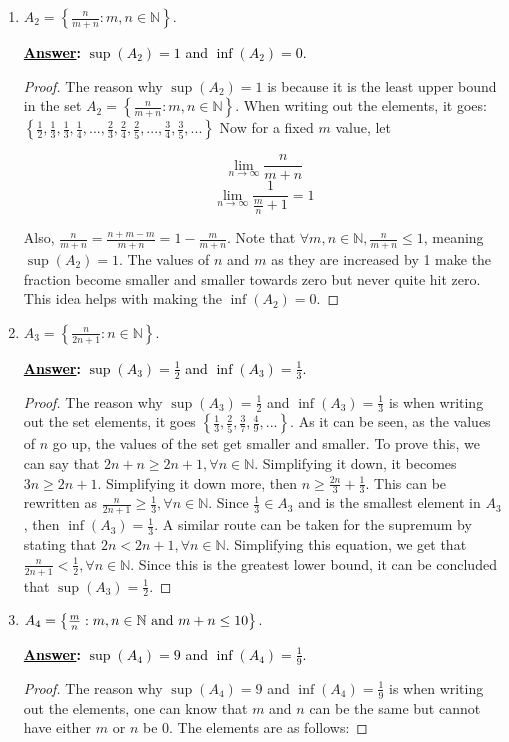 \documentclass[10pt]{article}
\begin{document}
\begin{enumerate}
\begin{enumerate}
	
	\item  $A_2 = \left\{\frac{n}{m+n}: m, n \in \mathbb{N}\right\}$.
	\par \medskip
	\textbf{\textcolor{black}{\underline{Answer}:}}
\textcolor{black}{$\sup{(A_2)}=1$ and $\inf{(A_2)} = 0$.}
\begin{proof}
The reason why $\sup{(A_2)}=1$ is because it is the least upper bound in the set $A_2 = \left\{\frac{n}{m+n}: m, n \in \mathbb{N}\right\}$.  When writing out the elements, it goes:$\left\{\frac{1}{2}, \frac{1}{3}, \frac{1}{3}, \frac{1}{4},...,\frac{2}{3}, \frac{2}{4}, \frac{2}{5},...,\frac{3}{4}, \frac{3}{5}, ...\right\}$ Now for a fixed $m$ value, let 
\begin{center}
\[\lim_{n\to\infty} \frac{n}{m+n}\] 
\[\lim_{n\to\infty} \frac{1}{\frac{m}{n} + 1} = 1\]
\end{center}
Also, $\frac{n}{m+n} = \frac{n+m-m}{m+n}=1-\frac{m}{m+n}$.  Note that $\forall m, n \in \mathbb{N}, \frac{n}{m+n} \leq 1$, meaning $\sup{(A_2)} =1$.
The values of $n$ and $m$ as they are increased by 1 make the fraction become smaller and smaller towards zero but never quite hit zero.  This idea helps with making the $\inf{(A_2)} = 0$.  
\end{proof}
	\item  $A_3 = \left\{\frac{n}{2n+1}: n \in \mathbb{N}\right\}$.
		\par \medskip
	\textbf{\textcolor{black}{\underline{Answer}:}}
\textcolor{black}{$\sup{(A_3)}=\frac{1}{2}$ and $\inf{(A_3)} = \frac{1}{3}$.}
\begin{proof}
The reason why $\sup{(A_3)}=\frac{1}{2}$ and $\inf{(A_3)} = \frac{1}{3}$ is when writing out the set elements, it goes $\left\{\frac{1}{3}, \frac{2}{5}, \frac{3}{7}, \frac{4}{9},...\right\}$.  As it can be seen, as the values of $n$ go up, the values of the set get smaller and smaller.  To prove this, we can say that $2n+n \geq 2n+1, \forall n \in \mathbb{N}$.  Simplifying it down, it becomes $3n \geq 2n+1$.  Simplifying it down more, then $n \geq \frac{2n}{3} + \frac{1}{3}$.  This can be rewritten as $\frac{n}{2n+1} \geq \frac{1}{3}, \forall n \in \mathbb{N}$.  Since $\frac{1}{3} \in A_3$ and is the smallest element in $A_3$, then $\inf{(A_3)} = \frac{1}{3}$.  A similar route can be taken for the supremum by stating that $2n < 2n+1, \forall n \in \mathbb{N}$.  Simplifying this equation, we get that $\frac{n}{2n+1} < \frac{1}{2}, \forall n \in \mathbb{N}$.  Since this is the greatest lower bound, it can be concluded that $\sup{(A_3)} = \frac{1}{2}$.
\end{proof}
	\item  $A_4 = \left\{ \frac{m}{n} : m, n \in \mathbb{N} \textnormal{ and } m+n \leq 10\right\}$.
		\par \medskip
	\textbf{\textcolor{black}{\underline{Answer}:}}
\textcolor{black}{$\sup{(A_4)}=9$ and $\inf{(A_4)} = \frac{1}{9}$.}
\begin{proof}
The reason why $\sup{(A_4)}=9$ and $\inf{(A_4)} = \frac{1}{9}$ is when writing out the elements, one can know that $m$ and $n$ can be the same but cannot have either $m$ or $n$ be $0$.  The elements are as follows: 


\end{proof}
\end{enumerate}
\end{enumerate}
\end{document}
